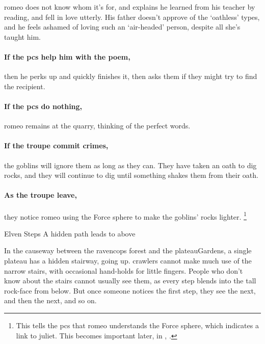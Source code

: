 \begin{multicols}{2}
\begin{speechtext}
\end{speechtext}

\gls{romeo} does not know whom it's for, and explains he learned from his teacher by reading, and fell in love utterly.
His father doesn't approve of the `oathless' types, and he feels ashamed of loving such an `air-headed' person, despite all she's taught him.

\paragraph{If the \glspl{pc} help him with the poem,}
then he perks up and quickly finishes it, then asks them if they might try to find the recipient.

\paragraph{If the \glspl{pc} do nothing,}
\gls{romeo} remains at the quarry, thinking of the perfect words.

\paragraph{If the troupe commit crimes,}
the goblins will ignore them as long as they can.
They have taken an oath to dig rocks, and they will continue to dig until something shakes them from their oath.

\romeo

\showStdSpells

\paragraph{As the troupe leave,}
they notice \gls{romeo} using the Force \gls{sphere} to make the goblins' rocks lighter.%
\footnote{This tells the \glspl{pc} that \gls{romeo} understands the Force \gls{sphere}, which indicates a link to \gls{juliet}.
This becomes important later, in , .}

{Elven Steps}%
{A hidden path leads to  above}%
\label{hiddenStairs}

In the causeway between the \gls{ravencops} forest and the \gls{plateauGardens}, a single plateau has a hidden stairway, going up.
\Glspl{crawler} cannot make much use of the narrow stairs, with occasional hand-holds for little fingers.
People who don't know about the stairs cannot usually see them, as every step blends into the tall rock-face from below.
But once someone notices the first step, they see the next, and then the next, and so on.


\end{multicols}
